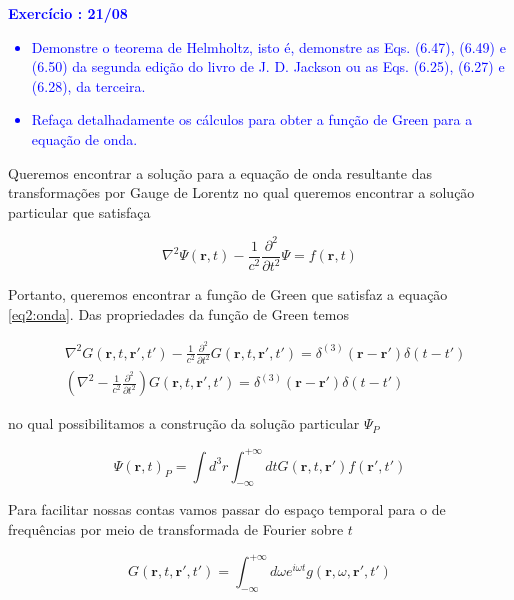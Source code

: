 \textcolor{blue}{
	\textbf{Exercício \paragraphnum: 21/08 }
	\begin{itemize}
		\item Demonstre o teorema de Helmholtz, isto é, demonstre as Eqs. (6.47), (6.49) e (6.50) da segunda edição do livro de J. D. Jackson ou as Eqs. (6.25), (6.27) e (6.28), da terceira.
		\item Refaça detalhadamente os cálculos para obter a função de Green para a equação de onda.
	\end{itemize}
}


Queremos encontrar a solução para a equação de onda resultante das transformações por Gauge de Lorentz no qual queremos encontrar a solução particular que satisfaça

\begin{equation}
	\nabla ^2 \Psi (\textbf{r},t) -\frac{1}{c^2}\frac{\partial^2}{\partial t^2} \Psi = 
	f(\textbf{r},t) 
	\label{eq2:onda}
\end{equation}

Portanto, queremos encontrar a função de Green que satisfaz a equação \ref{eq2:onda}. Das propriedades da função de Green temos

\begin{equation}
	\begin{split}
	&\nabla^2 G(\textbf{r}, t, \textbf{r}', t')  -\frac{1}{c^2}\frac{\partial^2}{\partial t^2}G(\textbf{r}, t, \textbf{r}', t') = 
	\delta^{(3)}(\textbf{r}-\textbf{r}') \delta (t-t') 
	\\
	&\left( \nabla^2 -\frac{1}{c^2}\frac{\partial^2}{\partial t^2}\right)  G(\textbf{r}, t, \textbf{r}', t') =
	\delta^{(3)}(\textbf{r}-\textbf{r}') \delta (t-t')
	\end{split}
	\label{eq2:func_green}
\end{equation}

no qual possibilitamos a construção da solução particular $\Psi_P$

\begin{equation}
	\Psi (\textbf{r}, t)_P= 
	\int d^3 r \int_{-\infty}^{+\infty} dt G(\textbf{r}, t, \textbf{r}') f(\textbf{r}', t')
	\label{eq2:psi}
\end{equation}

Para facilitar nossas contas vamos passar do espaço temporal para o de frequências por meio de transformada de Fourier sobre $t$

\begin{equation}
	G(\textbf{r},t, \textbf{r}', t') = 
	\int_{-\infty}^{+\infty} d\omega e^{i\omega t} g(\textbf{r},\omega, \textbf{r}', t')
	\label{eq2:fourier}
\end{equation}

